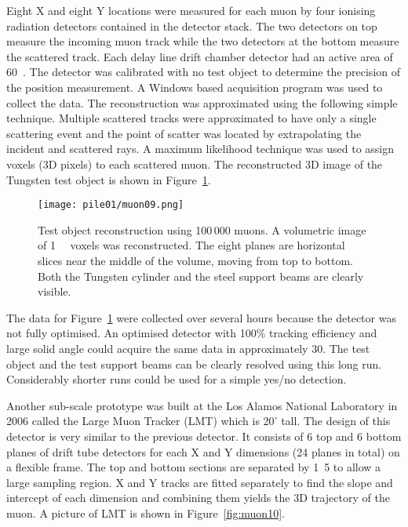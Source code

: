 \documentclass[twoside,titlepage,11pt,twocolumn,a4paper]{article}
\begin{document}
Eight X and eight Y locations were measured for each muon by four
ionising radiation detectors contained in the detector stack. The two
detectors on top measure the incoming muon track while the two
detectors at the bottom measure the scattered track. Each delay line
drift chamber detector had an active area of
\unit{60}{\square{\centi\metre}}. The detector was calibrated
with no test object to determine the precision of the position
measurement. A Windows based acquisition program was used to collect
the data. The reconstruction was approximated using the following
simple technique. Multiple scattered tracks were approximated to have
only a single scattering event and the point of scatter was located by
extrapolating the incident and scattered rays. A maximum likelihood
technique was used to assign voxels (3D pixels) to each scattered
muon. The reconstructed 3D image of the Tungsten test object is shown
in Figure~\ref{fig:muon09}. \citep{Priedhorsky2003}

\begin{figure}
  \texttt{[image: pile01/muon09.png]}
  \caption{Test object reconstruction using 100\,000 muons. A
    volumetric image of \unit{1}{\cubic{\centi\metre}}
    voxels was reconstructed. The eight planes are horizontal slices
    near the middle of the volume, moving from top to bottom. Both the
    Tungsten cylinder and the steel support beams are clearly
    visible. \citep{Priedhorsky2003}}
  \label{fig:muon09}
\end{figure}

The data for Figure~\ref{fig:muon09} were collected over several hours
because the detector was not fully optimised. An optimised detector
with 100\% tracking efficiency and large solid angle could acquire the
same data in approximately \unit{30}{\minute}. The test object and the
test support beams can be clearly resolved using this long
run. Considerably shorter runs could be used for a simple yes/no
detection. \citep{Priedhorsky2003}

Another sub-scale prototype was built at the Los Alamos National
Laboratory in 2006 called the Large Muon Tracker (LMT) which is 20'
tall. The design of this detector is very similar to the previous
detector. It consists of 6 top and 6 bottom planes of drift tube
detectors for each X and Y dimensions (24 planes in total) on a
flexible frame. The top and bottom sections are separated by
\unit{1.5}{\metre} to allow a large sampling region. X and Y tracks
are fitted separately to find the slope and intercept of each
dimension and combining them yields the 3D trajectory of the muon. A
picture of LMT is shown in Figure~\ref{fig:muon10}. \citep{green2006}
\end{document}
